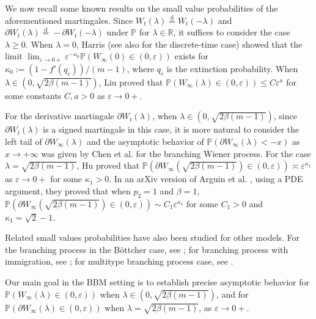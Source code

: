 \documentclass[10pt,a4paper]{amsart}
\numberwithin{equation}{section}
\begin{document}
We now 
recall some known results on the small value probabilities of the aforementioned martingales.
Since $W_t(\lambda) \stackrel{\mathrm{d}}{=} W_t(-\lambda)$ and $\partial W_t(\lambda) \stackrel{\mathrm{d}}{=} - \partial W_t(-\lambda)$ under $\mathbb{P}$ for $\lambda \in \mathbb{R}$, 
it suffices to consider the case $\lambda \geq 0$. When $\lambda = 0$, Harris \cite[Remark, p.~110]{Harris1963} (see also \cite{Dubuc, MO2008} for the discrete-time case) showed that
the limit
$\lim_{\varepsilon \to 0+} \varepsilon^{-\kappa_0} \mathbb{P}(W_\infty(0) \in (0, \varepsilon))$ exists for $\kappa_0 := (1 - f'(q_c))/(m - 1)$, where $q_c$ is the extinction probability. 
When $\lambda \in (0, \sqrt{2\beta(m-1)})$, Liu \cite[Theorem 2.4]{Liu2001} proved that $\mathbb{P}(W_\infty(\lambda)
\in (0,\varepsilon)
) \leq C \varepsilon^a$ for some constants $C, a > 0$ as $\varepsilon \to 0+$.

For the derivative martingale $\partial W_t(\lambda)$, 
when $\lambda \in (0,\sqrt{2\beta(m-1)})$, since  $\partial W_t(\lambda)$
is a signed 
martingale  in this case, it is more natural to consider the left tail of $\partial W_\infty(\lambda)$ and  
the asymptotic behavior of $\mathbb{P}
(\partial W_\infty(\lambda)< -x)$ as $x \to +\infty$ was given by Chen et al. \cite[Theorem 1.1]{CHM2025} for the branching Wiener process. For the case $\lambda = \sqrt{2\beta(m-1)}$, Hu \cite[Theorem 1.3]{Hu2016} proved that $\mathbb{P}(\partial W_\infty(\sqrt{2\beta(m-1)}) \in (0, \varepsilon)) \asymp \varepsilon^{\kappa_1}$ as $\varepsilon \to 0+$ for  some $\kappa_1 > 0$. In an arXiv version of Arguin et al. \cite[Proposition A.1]{ABK10}, using a PDE argument, they proved that when $p_2 = 1$
and $\beta=1$, 
$
\mathbb{P}
(\partial W_\infty(\sqrt{2\beta(m-1)}) \in (0, \varepsilon)) \sim C_1 \varepsilon^{\kappa_1}$ for some $C_1 > 0$
and $\kappa_1= \sqrt{2}-1$.


Related small values probabilities have also been studied for other models. For the branching process in the B\"ottcher case, see  \cite{BB1993, FW2009, Hambly}; for branching process with immigration, see \cite{CLR2014, Sidorova}; for multitype branching process case, see \cite{Chu2014, Jones}.

Our main goal in the BBM setting is to establish precise asymptotic behavior for $\mathbb{P}(W_\infty(\lambda) \in (0, \varepsilon))$ when $\lambda \in (0, \sqrt{2\beta(m-1)})$, and for $\mathbb{P}(\partial W_\infty(\lambda) \in (0, \varepsilon))$ when $\lambda = \sqrt{2\beta(m-1)}$, as $\varepsilon \to 0+$.
\end{document}
